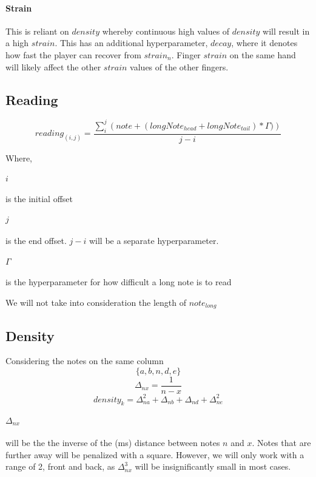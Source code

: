 \documentclass{article}
\begin{document}
\paragraph{Strain} This is reliant on $density$ whereby continuous high values of $ density$ will result in a high $strain$. This has an additional hyperparameter, $decay$, where it denotes how fast the player can recover from $strain_n$. Finger $strain$ on the same hand will likely affect the other $strain$ values of the other fingers.

\subsection{Reading}

$$ reading_{(i,j)} = \frac{\sum_{i}^{j} \left( note + (longNote_{head} + longNote_{tail}) * \Gamma) \right)}{j - i}$$

Where,

\paragraph{$i$} is the initial offset
\paragraph{$j$} is the end offset. $j - i$ will be a separate hyperparameter.
\paragraph{$\Gamma$} is the hyperparameter for how difficult a long note is to read

We will not take into consideration the length of $note_{long}$

\subsection{Density}

Considering the notes on the same column
$$ \lbrace a, b, n, d, e \rbrace $$
$$ \Delta_{nx} = \frac{1}{n - x}$$
$$ density_{k} = \Delta_{na}^2 + \Delta_{nb} + \Delta_{nd} + \Delta_{ne}^2  $$

\paragraph{$\Delta_{nx}$} will be the the inverse of the (ms) distance between notes $n$ and $x$. Notes that are further away will be penalized with a square. However, we will only work with a range of 2, front and back, as  $\Delta_{nx}^3$ will be insignificantly small in most cases.

 
\end{document}
